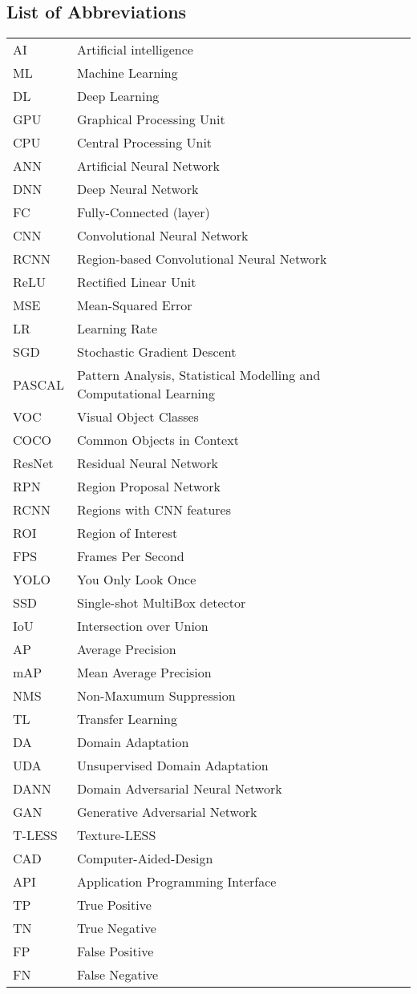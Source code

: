 \documentclass[english, 12pt, a4paper, elec, utf8, a-1b, online]{aaltothesis}
\begin{document}
\subsection*{List of Abbreviations}


\begin{tabular}{ll}
AI         & Artificial intelligence\\
ML         & Machine Learning\\
DL         & Deep Learning\\
GPU        & Graphical Processing Unit\\
CPU        & Central Processing Unit\\
ANN        & Artificial Neural Network\\
DNN        & Deep Neural Network\\
FC         & Fully-Connected (layer)\\
CNN        & Convolutional Neural Network\\
RCNN       & Region-based Convolutional Neural Network\\
ReLU       & Rectified Linear Unit\\
MSE        & Mean-Squared Error\\
LR 			&Learning Rate\\
SGD        & Stochastic Gradient Descent\\
PASCAL		& Pattern Analysis, Statistical Modelling and Computational Learning\\
VOC	 		& Visual Object Classes\\
COCO		& Common Objects in Context\\
ResNet		&Residual Neural Network\\
RPN			&Region Proposal Network\\
RCNN		&Regions with CNN features\\
ROI			&Region of Interest\\
FPS			&Frames Per Second\\
YOLO		&You Only Look Once \\
SSD			&Single-shot MultiBox detector\\
IoU 		&Intersection over Union\\
AP			&Average Precision\\
mAP			&Mean Average Precision\\
NMS			&Non-Maxumum Suppression\\
TL			&Transfer Learning\\
DA			&Domain Adaptation\\
UDA			&Unsupervised Domain Adaptation\\
DANN		&Domain Adversarial Neural Network  \\
GAN			&Generative Adversarial Network\\
T-LESS		&Texture-LESS\\
CAD 		&Computer-Aided-Design\\
API			&Application Programming Interface\\
TP			&True Positive\\
TN			&True Negative\\
FP			&False Positive\\
FN			&False Negative\\
\end{tabular}
 
\end{document}

